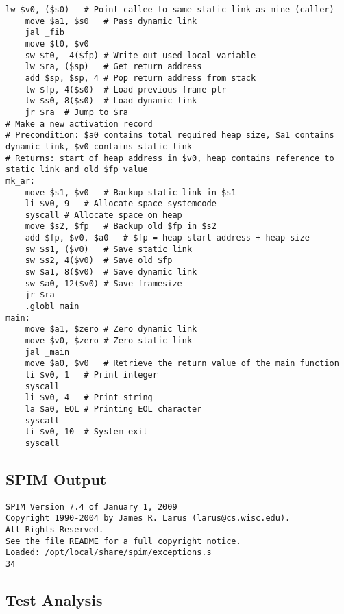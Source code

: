 \begin{lstlisting}[showstringspaces=false,breaklines=true,backgroundcolor=\color{light-gray}, captionpos=b]
	lw $v0, ($s0)	# Point callee to same static link as mine (caller)
	move $a1, $s0	# Pass dynamic link
	jal _fib
	move $t0, $v0
	sw $t0, -4($fp)	# Write out used local variable
	lw $ra, ($sp)	# Get return address
	add $sp, $sp, 4	# Pop return address from stack
	lw $fp, 4($s0)	# Load previous frame ptr
	lw $s0, 8($s0)	# Load dynamic link
	jr $ra	# Jump to $ra
# Make a new activation record
# Precondition: $a0 contains total required heap size, $a1 contains dynamic link, $v0 contains static link
# Returns: start of heap address in $v0, heap contains reference to static link and old $fp value
mk_ar:
	move $s1, $v0	# Backup static link in $s1
	li $v0, 9	# Allocate space systemcode
	syscall	# Allocate space on heap
	move $s2, $fp	# Backup old $fp in $s2
	add $fp, $v0, $a0	# $fp = heap start address + heap size
	sw $s1, ($v0)	# Save static link
	sw $s2, 4($v0)	# Save old $fp
	sw $a1, 8($v0)	# Save dynamic link
	sw $a0, 12($v0)	# Save framesize
	jr $ra
	.globl main
main:
	move $a1, $zero	# Zero dynamic link
	move $v0, $zero	# Zero static link
	jal _main
	move $a0, $v0	# Retrieve the return value of the main function
	li $v0, 1	# Print integer
	syscall
	li $v0, 4	# Print string
	la $a0, EOL	# Printing EOL character
	syscall
	li $v0, 10	# System exit
	syscall

\end{lstlisting}\subsection{SPIM Output}
\begin{verbatim}
SPIM Version 7.4 of January 1, 2009
Copyright 1990-2004 by James R. Larus (larus@cs.wisc.edu).
All Rights Reserved.
See the file README for a full copyright notice.
Loaded: /opt/local/share/spim/exceptions.s
34
\end{verbatim}\subsection{Test Analysis}

